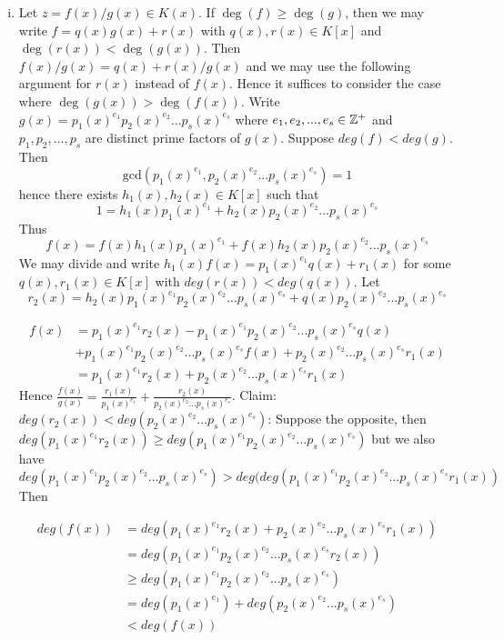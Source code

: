 \begin{solution}
	\begin{enumerate}[(i)] 
		\item Let $z = f(x)/g(x) \in K(x)$. If $\deg(f) \geq \deg(g)$, 
		then we may write $f = q(x)g(x) + r(x)$ with $q(x),r(x) \in K[x]$ and
		$\deg(r(x)) < \deg(g(x))$. Then $f(x)/g(x) = q(x) + r(x)/g(x)$ and we may use 
		the following argument for $r(x)$ instead of $f(x)$.
		Hence it suffices to consider the case 
		where $\deg(g(x)) > \deg(f(x))$. Write $g(x) = p_1(x)^{e_1}p_2(x)^{e_2}...p_s(x)^{e_s}$ 
		where $e_1,e_2,...,e_s \in \mathbb{Z}^{+}$ and $p_1,p_2,...,p_s$ are distinct 
		prime factors of $g(x)$. Suppose $deg(f) < deg(g)$. Then 
		$$\text{gcd}(p_1(x)^{e_1},p_2(x)^{e_2}...p_s(x)^{e_s}) = 1$$ hence there exists 
		$h_1(x),h_2(x) \in K[x]$ such that $$1 = h_1(x)p_1(x)^{e_1} + h_2(x)p_2(x)^{e_2}...p_s(x)^{e_s}$$ 
		Thus $$f(x) = f(x)h_1(x)p_1(x)^{e_1} + f(x)h_2(x)p_2(x)^{e_2}...p_s(x)^{e_s}$$ 
		We may divide and write $h_1(x)f(x) = p_1(x)^{e_1}q(x) + r_1(x)$ 
		for some $q(x),r_1(x) \in K[x]$ with $deg(r(x)) < deg(q(x))$. 
		Let $$r_2(x) = h_2(x)p_1(x)^{e_1}p_2(x)^{e_2}...p_s(x)^{e_s} + q(x)p_2(x)^{e_2}...p_s(x)^{e_s}$$ 

		\begin{align*} 
			f(x) &= p_1(x)^{e_1}r_2(x) - p_1(x)^{e_1}p_2(x)^{e_2}...p_s(x)^{e_s}q(x) \\
			&+ p_1(x)^{e_1}p_2(x)^{e_2}...p_s(x)^{e_s}f(x) + p_2(x)^{e_2}...p_s(x)^{e_s}r_1(x) \\
			&= p_1(x)^{e_1}r_2(x) + p_2(x)^{e_2}...p_s(x)^{e_s}r_1(x)
		\end{align*}
		Hence $\frac{f(x)}{g(x)} = \frac{r_1(x)}{p_1(x)^{e_1}} + \frac{r_2(x)}{p_2(x)^{e_2}...p_s(x)^{e_s}} $. 
		Claim: $deg(r_2(x)) < deg(p_2(x)^{e_2}...p_s(x)^{e_s})$: Suppose the opposite, 
		then $deg(p_1(x)^{e_1}r_2(x)) \geq deg(p_1(x)^{e_1}p_2(x)^{e_2}...p_s(x)^{e_s})$ 
		but we also have 
		$$deg(p_1(x)^{e_1}p_2(x)^{e_2}...p_s(x)^{e_s}) >  
		deg(deg(p_1(x)^{e_1}p_2(x)^{e_2}...p_s(x)^{e_s}r_1(x))$$
		Then
		    
		\begin{align*}
			deg(f(x)) &= deg(p_1(x)^{e_1}r_2(x) + p_2(x)^{e_2}...p_s(x)^{e_s}r_1(x)) \\
			&= deg(p_1(x)^{e_1}p_2(x)^{e_2}...p_s(x)^{e_s}r_2(x)) \\
			&\geq deg(p_1(x)^{e_1}p_2(x)^{e_2}...p_s(x)^{e_s}) \\
			&= deg(p_1(x)^{e_1}) + deg(p_2(x)^{e_2}...p_s(x)^{e_s}) \\
			&< deg(f(x))
		\end{align*}


\end{enumerate}
\end{solution}
